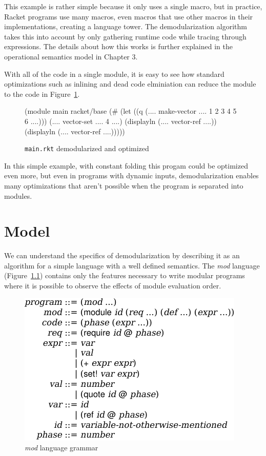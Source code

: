 \documentclass[ms,electronic,letterpaper,lol,lof,lot]{byumsphd}
\begin{document}
This example is rather simple because it only uses a single macro, but in practice, Racket programs use many macros, even macros that use other macros in their implementations, creating a language tower.
The demodularization algorithm takes this into account by only gathering runtime code while tracing through  expressions.
The details about how this works is further explained in the operational semantics model in Chapter 3.

With all of the code in a single module, it is easy to see how standard optimizations such as inlining and dead code elminiation can reduce the module to the code in Figure~\ref{main-demod-opt-rkt}.
\begin{figure}[h]
\begin{schemedisplay}
(module main racket/base
  (#%
   (let ((q (.... make-vector .... 1 2 3 4 5 6 ....)))
     (.... vector-set .... 4 ....)
     (displayln (.... vector-ref ....))
     (displayln (.... vector-ref ....)))))
\end{schemedisplay}
\caption{\texttt{main.rkt} demodularized and optimized}
\label{main-demod-opt-rkt}
\end{figure}
In this simple example, with constant folding this progam could be optimized even more, but even in programs with dynamic inputs, demodularization enables many optimizations that aren't possible when the program is separated into modules.

\chapter{Model}

We can understand the specifics of demodularization by describing it as an algorithm for a simple language with a well defined semantics.
The \emph{mod} language (Figure~\ref{source-lang}) contains only the features necessary to write modular programs where it is possible to observe the effects of module evaluation order.

\begin{figure}[h]
\includegraphics{source}
\caption{\emph{mod} language grammar}
\label{source-lang}
\end{figure}
\end{document}
